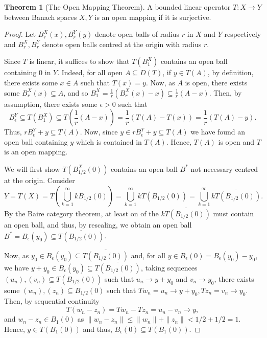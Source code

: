 \documentclass[]{article}
\theoremstyle{definition}
\newtheorem{theorem}{Theorem}
\theoremstyle{definition}
\begin{document}
\begin{theorem}[The Open Mapping Theorem]
  A bounded linear operator \(T : X \to Y\) between Banach spaces \(X, Y\) 
  is an open mapping if it is surjective.
\end{theorem}
\begin{proof}
  Let \(B^X_r(x), B^Y_r(y)\) denote open balls of radius \(r\) in \(X\) and \(Y\) 
  respectively and \(B^X_r, B^Y_r\) denote open balls centred at the origin with 
  radius \(r\). 
  
  Since \(T\) is linear, it suffices to show that \(T(B_1^X)\) contains an 
  open ball containing \(0\) in \(Y\). Indeed, for all open 
  \(A \subseteq D(T)\), if \(y \in T(A)\), by definition, there exists some 
  \(x \in A\) such that \(T(x) = y\). Now, as \(A\) is open, there exists some 
  \(B_r^X(x) \subseteq A\), and so 
  \(B^X_1 = \frac{1}{r} (B_r^X(x) - x) \subseteq \frac{1}{r} (A - x)\). 
  Then, by assumption, there exists some \(\epsilon > 0\) such that 
  \[B_\epsilon^Y \subseteq T(B_1^X) \subseteq T\left(\frac{1}{r}(A - x)\right) = 
    \frac{1}{r}(T(A) - T(x)) = \frac{1}{r}(T(A) - y).\]
  Thus, \(r B_\epsilon^Y + y \subseteq T(A)\). Now, since 
  \(y \in r B_\epsilon^Y + y \subseteq T(A)\) we have found an open ball 
  containing \(y\) which is contained in \(T(A)\). Hence, \(T(A)\) is open 
  and \(T\) is an open mapping.

  We will first show \(T(B^X_{1 / 2}(0))\) contains an open ball \(B^*\) not 
  necessary centred at the origin. Consider 
  \[Y = T(X) = T\left(\bigcup_{k = 1}^\infty k B_{1 / 2}(0)\right) 
    = \bigcup_{k = 1}^\infty k T(B_{1 / 2}(0))
    = \bigcup_{k = 1}^\infty \overline{k T(B_{1 / 2}(0))}.\]
  By the Baire category theorem, at least on of the 
  \(\overline{k T(B_{1 / 2}(0))}\) must contain an open ball, and thus, by 
  rescaling, we obtain an open ball \(B^* = B_\epsilon(y_0) 
  \subseteq \overline{T(B_{1 / 2}(0))}\). 
  
  Now, as \(y_0 \in B_\epsilon(y_0) \subseteq \overline{T(B_{1 / 2}(0))}\) 
  and, for all \(y \in B_\epsilon(0) = B_\epsilon(y_0) - y_0\), we have 
  \(y + y_0 \in B_\epsilon(y_0) \subseteq \overline{T(B_{1 / 2}(0))}\),
  taking sequences \((u_n), (v_n) \subseteq T(B_{1 / 2}(0))\) such that 
  \(u_n \to y + y_0\) and \(v_n \to y_0\), there 
  exists some \((w_n), (z_n) \subseteq B_{1 / 2}(0)\) such that 
  \(T w_n = u_n \to y + y_0, T z_n = v_n \to y_0\). Then, 
  by sequential continuity
  \[T(w_n - z_n) = T w_n - T z_n = u_n - v_n \to y,\]
  and \(w_n - z_n \in B_1(0)\) as \(\|w_n - z_n\| \le \|w_n\| + \|z_n\| 
  < 1 / 2 + 1 / 2 = 1\). Hence, \(y \in \overline{T(B_1(0))}\) and thus, 
  \(B_\epsilon(0) \subseteq \overline{T(B_1(0))}\).
  

\end{proof}
\end{document}

